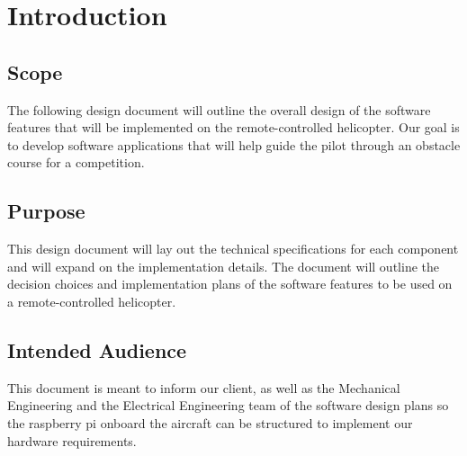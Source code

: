 \documentclass[onecolumn, oneside, letterpaper, draftclsnofoot, 10pt, compsoc]{IEEEtran}
\begin{document}
\newpage
\section{Introduction}
\subsection{Scope}
The following design document will outline the overall design of the software features that will be implemented on the remote-controlled helicopter. Our goal is to develop software applications that will help guide the pilot through an obstacle course for a competition.
\subsection{Purpose}
This design document will lay out the technical specifications for each component and will expand on the implementation details. The document will outline the decision choices and implementation plans of the software features to be used on a remote-controlled helicopter.

\subsection{Intended Audience}
This document is meant to inform our client, as well as the Mechanical Engineering and the Electrical Engineering team of the software design plans so the raspberry pi onboard the aircraft can be structured to implement our hardware requirements.
\end{document}
